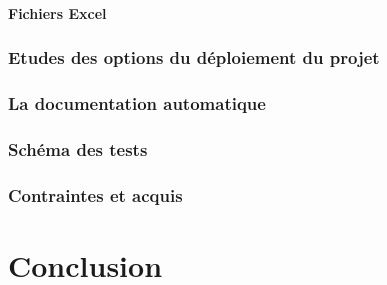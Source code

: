 \documentclass[12pt,a4paper]{report}
\begin{document}
\subsubsection {Fichiers Excel}

\subsection {Etudes des options du déploiement du projet }

\subsection {La documentation automatique  }
\subsection {Schéma des tests }

\subsection {Contraintes et acquis }
\newpage
\chapter{Conclusion}




	
	
	
\end{document}

